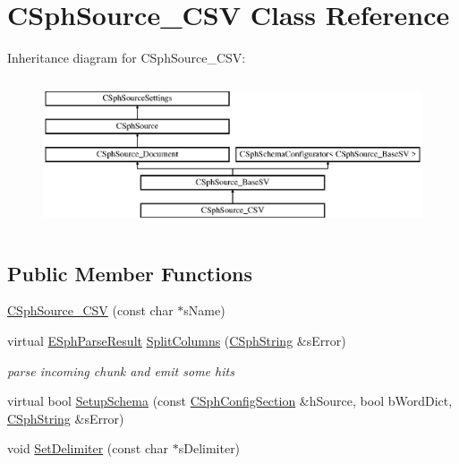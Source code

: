 \hypertarget{classCSphSource__CSV}{\section{C\-Sph\-Source\-\_\-\-C\-S\-V Class Reference}
\label{classCSphSource__CSV}
}
Inheritance diagram for C\-Sph\-Source\-\_\-\-C\-S\-V\-:\begin{figure}[H]
\begin{center}
\leavevmode
\includegraphics[height=4.444445cm]{classCSphSource__CSV}
\end{center}
\end{figure}
\subsection*{Public Member Functions}
\begin{DoxyCompactItemize}
\item 
\hyperlink{classCSphSource__CSV_a02b84d7f0c9c9d5ee53428abcd356313}{C\-Sph\-Source\-\_\-\-C\-S\-V} (const char $\ast$s\-Name)
\item 
virtual \hyperlink{classCSphSource__BaseSV_aa78147110220c575814ba85191261524}{E\-Sph\-Parse\-Result} \hyperlink{classCSphSource__CSV_a57888a392b298f92d7dfb3c769e6caee}{Split\-Columns} (\hyperlink{structCSphString}{C\-Sph\-String} \&s\-Error)
\begin{DoxyCompactList}\small\item\em parse incoming chunk and emit some hits \end{DoxyCompactList}\item 
virtual bool \hyperlink{classCSphSource__CSV_abfcf53c68c9bf46c74e4712c680c58f9}{Setup\-Schema} (const \hyperlink{classCSphConfigSection}{C\-Sph\-Config\-Section} \&h\-Source, bool b\-Word\-Dict, \hyperlink{structCSphString}{C\-Sph\-String} \&s\-Error)
\item 
void \hyperlink{classCSphSource__CSV_a0f2a654df38e75600a539b930485944a}{Set\-Delimiter} (const char $\ast$s\-Delimiter)
\end{DoxyCompactItemize}
